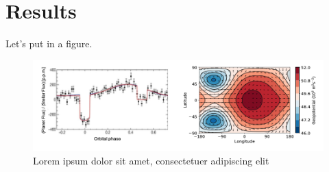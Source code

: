 \section{Results}
\label{ch2:results}


Let's put in a figure.

\begin{figure}[h]
    \centering
    \includegraphics[width=\textwidth]{figures/random-figure.png}
    \caption{Lorem ipsum dolor sit amet, consectetuer adipiscing elit \parencite{Elliott2016}}
    \label{fig:ch2-rand}
\end{figure}

\lipsum[2]